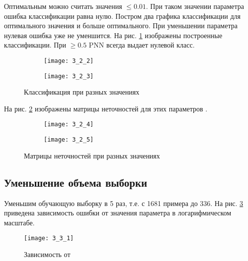 Оптимальным можно считать значения  $\leq 0.01$. При таком значении параметра ошибка классификации равна нулю. Постром два графика классификации для оптимального значения  и больше оптимального. При уменьшении параметра нулевая ошибка уже не уменшится. На рис. \ref{fig:3_2_2} изображены построенные классификации. При  $\geq 0.5$ PNN всегда выдает нулевой класс.
\begin{figure}[H]
\begin{center}
	\begin{subfigure}{0.49\textwidth}
		\texttt{[image: 3\_2\_2]}
		\caption{}
	\end{subfigure}
	\begin{subfigure}{0.49\textwidth}
		\texttt{[image: 3\_2\_3]}
		\caption{}
	\end{subfigure}
	\caption{Классификация при разных значениях }
	\label{fig:3_2_2}
\end{center}
\end{figure}

На рис. \ref{fig:3_2_3} изображены матрицы неточностей для этих параметров .
\begin{figure}[H]
\begin{center}
	\begin{subfigure}{0.49\textwidth}
		\texttt{[image: 3\_2\_4]}
		\caption{}
	\end{subfigure}
	\begin{subfigure}{0.49\textwidth}
		\texttt{[image: 3\_2\_5]}
		\caption{}
	\end{subfigure}
	\caption{Матрицы неточностей при разных значениях }
	\label{fig:3_2_3}
\end{center}
\end{figure}

\subsection{Уменьшение объема выборки}


Уменьшим обучающую выборку в 5 раз, т.е. с 1681 примера до 336. На рис. \ref{fig:3_3_1} приведена зависимость ошибки  от значения параметра  в логарифмическом масштабе. 
\begin{figure}[H]
\begin{center}
	\texttt{[image: 3\_3\_1]}
	\caption{Зависимость  от }
	\label{fig:3_3_1}
\end{center}
\end{figure}

